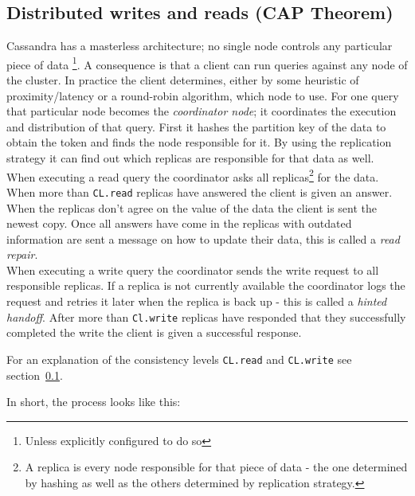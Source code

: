 \subsection{Distributed writes and reads (CAP Theorem)} \label{subsec:cassandra:cap}

Cassandra has a masterless architecture; no single node controls any particular piece of data \autocite[5]{cassandra_paper}\footnote{Unless explicitly configured to do so}. A consequence is that a client can run queries against any node of the cluster. In practice the client determines, either by some heuristic of proximity/latency or a round-robin algorithm, which node to use.
For one query that particular node becomes the \textit{coordinator node}; it coordinates the execution and distribution of that query.
First it hashes the partition key of the data to obtain the token and finds the node responsible for it. By using the replication strategy it can find out which replicas are responsible for that data as well. \\
When executing a read query the coordinator asks all replicas\footnote{A replica is every node responsible for that piece of data - the one determined by hashing as well as the others determined by replication strategy.} for the data. When more than \texttt{CL.read} replicas have answered the client is given an answer. When the replicas don't agree on the value of the data the client is sent the newest copy. Once all answers have come in the replicas with outdated information are sent a message on how to update their data, this is called a \textit{read repair}. \autocite{cassandra_distributed_read} \\
When executing a write query the coordinator sends the write request to all responsible replicas. If a replica is not currently available the coordinator logs the request and retries it later when the replica is back up  - this is called a \textit{hinted handoff}\autocite[6,7]{cassandraInCAPtheorem}. After more than \texttt{Cl.write} replicas have responded that they successfully completed the write the client is given a successful response. \autocite{cassandra_distributed_write}

For an explanation of the consistency levels \texttt{CL.read} and \texttt{CL.write} see section~\ref{subsec:cassandra:cap}.

In short, the process looks like this:

